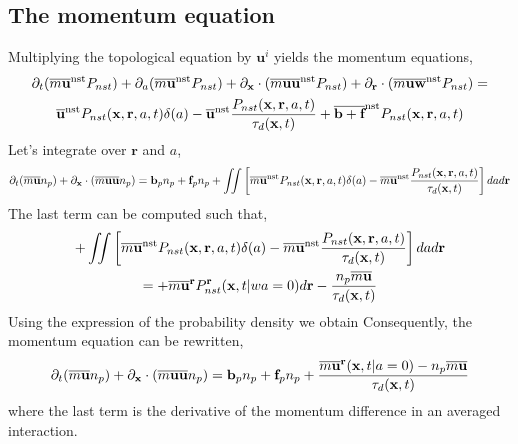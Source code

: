 \subsection{The momentum equation}
Multiplying the topological equation by $\textbf{u}^i$ yields the momentum equations, 
\begin{multline}
    \partial_t (\overline{m\textbf{u}}^\text{nst} P_{nst})
    + \partial_a (\overline{m\textbf{u}}^\text{nst} P_{nst})
    + \partial_{\textbf{x}} \cdot (\overline{m\textbf{u}\textbf{u} }^\text{nst} P_{nst})
    + \partial_{\textbf{r}}  \cdot (\overline{m\textbf{u}\textbf{w}}^\text{nst} P_{nst})
    =  \\
    \overline{\textbf{u}}^\text{nst} P_{nst}(\textbf{x},\textbf{r},a,t)\delta(a)
    - \overline{\textbf{u}}^\text{nst}  \frac{P_{nst}(\textbf{x},\textbf{r},a,t)}{\tau_d(\textbf{x},t)}
    + \overline{\textbf{b}+\textbf{f}}^\text{nst}P_{nst}(\textbf{x},\textbf{r},a,t)
\end{multline}
Let's integrate over $\textbf{r}$ and $a$, 
\begin{multline}
    \partial_t (\overline{m\textbf{u}} n_p)
    + \partial_{\textbf{x}} \cdot (\overline{m\textbf{u}\textbf{u} } n_p)
    =  
    \textbf{b}_p n_p 
    +\textbf{f}_p  n_p
    + \iint \left[
        \overline{m\textbf{u}}^\text{nst} P_{nst}(\textbf{x},\textbf{r},a,t)\delta(a)
        - \overline{m\textbf{u}}^\text{nst}  \frac{P_{nst}(\textbf{x},\textbf{r},a,t)}{\tau_d(\textbf{x},t)}
        \right] da d\textbf{r}
\end{multline}
The last term can be computed such that,
\begin{multline}
   + \iint \left[
       \overline{m \textbf{u}}^\text{nst} P_{nst}(\textbf{x},\textbf{r},a,t)\delta(a)
       - \overline{m \textbf{u}}^\text{nst}  \frac{P_{nst}(\textbf{x},\textbf{r},a,t)}{\tau_d(\textbf{x},t)}
       \right] da d\textbf{r}\\
    =
   + \overline{m \textbf{u}}^{\textbf{r}} P^\textbf{r}_{nst}(\textbf{x},t|wa =0) d\textbf{r}
   - \frac{n_p \overline{m \textbf{u}}  }{\tau_d(\textbf{x},t)}
\end{multline}
Using the expression of the probability density we obtain
Consequently, the momentum equation can be rewritten, 
\begin{equation}
    \partial_t (\overline{m\textbf{u}} n_p)
    + \partial_{\textbf{x}} \cdot (\overline{m\textbf{u}\textbf{u} } n_p)
    =  
    \textbf{b}_p n_p 
    +\textbf{f}_p  n_p 
    + \frac{\overline{m \textbf{u}}^{\textbf{r}}(\textbf{x},t|a =0) - n_p \overline{m \textbf{u}}  }{\tau_d(\textbf{x},t)}
\end{equation}
where the last term is the derivative of the momentum difference in an averaged interaction.

